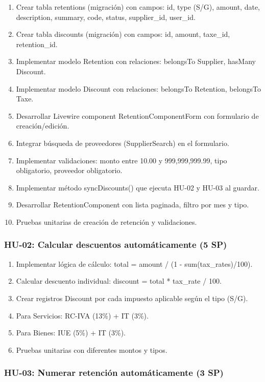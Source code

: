 \documentclass[stu]{apa7}
\begin{document}
\begin{enumerate}
    \item Crear tabla retentions (migración) con campos: id, type (S/G), amount, date, description, summary, code, status, supplier\_id, user\_id.
    \item Crear tabla discounts (migración) con campos: id, amount, taxe\_id, retention\_id.
    \item Implementar modelo Retention con relaciones: belongsTo Supplier, hasMany Discount.
    \item Implementar modelo Discount con relaciones: belongsTo Retention, belongsTo Taxe.
    \item Desarrollar Livewire component RetentionComponentForm con formulario de creación/edición.
    \item Integrar búsqueda de proveedores (SupplierSearch) en el formulario.
    \item Implementar validaciones: monto entre 10.00 y 999,999,999.99, tipo obligatorio, proveedor obligatorio.
    \item Implementar método syncDiscounts() que ejecuta HU-02 y HU-03 al guardar.
    \item Desarrollar RetentionComponent con lista paginada, filtro por mes y tipo.
    \item Pruebas unitarias de creación de retención y validaciones.
\end{enumerate}

\subsubsection{HU-02: Calcular descuentos automáticamente (5 SP)}

\begin{enumerate}
    \item Implementar lógica de cálculo: total = amount / (1 - sum(tax\_rates)/100).
    \item Calcular descuento individual: discount = total * tax\_rate / 100.
    \item Crear registros Discount por cada impuesto aplicable según el tipo (S/G).
    \item Para Servicios: RC-IVA (13\%) + IT (3\%).
    \item Para Bienes: IUE (5\%) + IT (3\%).
    \item Pruebas unitarias con diferentes montos y tipos.
\end{enumerate}

\subsubsection{HU-03: Numerar retención automáticamente (3 SP)}
\end{document}
